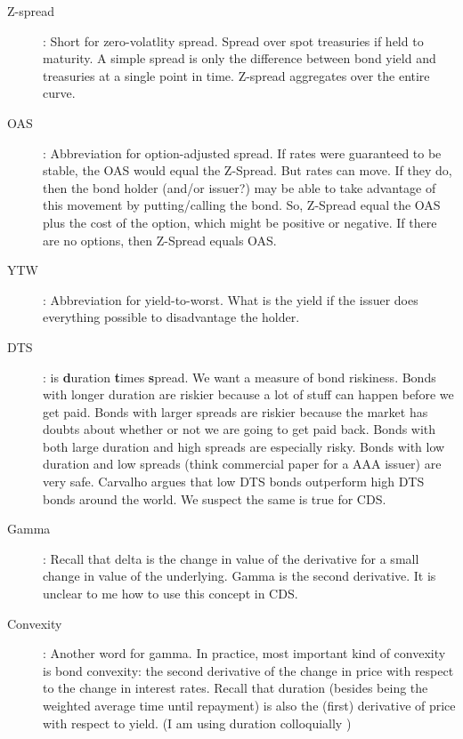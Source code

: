 \documentclass[12pt]{article}
\begin{document}
\begin{description}
  \item[Z-spread]: Short for zero-volatlity spread. Spread over spot treasuries if held to maturity. A simple spread is only the difference between bond yield and treasuries at a single point in time. Z-spread aggregates over the entire curve.
  \item[OAS]: Abbreviation for option-adjusted spread. If rates were guaranteed to be stable, the OAS would equal the Z-Spread. But rates can move. If they do, then the bond holder (and/or issuer?) may be able to take advantage of this movement by putting/calling the bond. So, Z-Spread equal the OAS plus the cost of the option, which might be positive or negative. If there are no options, then Z-Spread equals OAS.  
  \item[YTW]: Abbreviation for yield-to-worst. What is the yield if the issuer does everything possible to disadvantage the holder.
  
  \item[DTS]: is \textbf{d}uration \textbf{t}imes \textbf{s}pread. We want a measure of bond riskiness. Bonds with longer duration are riskier because a lot of stuff can happen before we get paid. Bonds with larger spreads are riskier because the market has doubts about whether or not we are going to get paid back. Bonds with both large duration and high spreads are especially risky. Bonds with low duration and low spreads (think commercial paper for a AAA issuer) are very safe. Carvalho argues that low DTS bonds outperform high DTS bonds around the world. We suspect the same is true for CDS.
  
  \item[Gamma]: Recall that delta is the change in value of the derivative for a small change in value of the underlying. Gamma is the second derivative. It is unclear to me how to use this concept in CDS.
  
  \item[Convexity]: Another word for gamma. In practice, most important kind of convexity is bond convexity: the second derivative of the change in price with respect to the change in interest rates. Recall that duration (besides being the weighted average time until repayment) is also the (first) derivative of price with respect to yield. (I am using duration colloquially )
  

\end{description}
\end{document}
